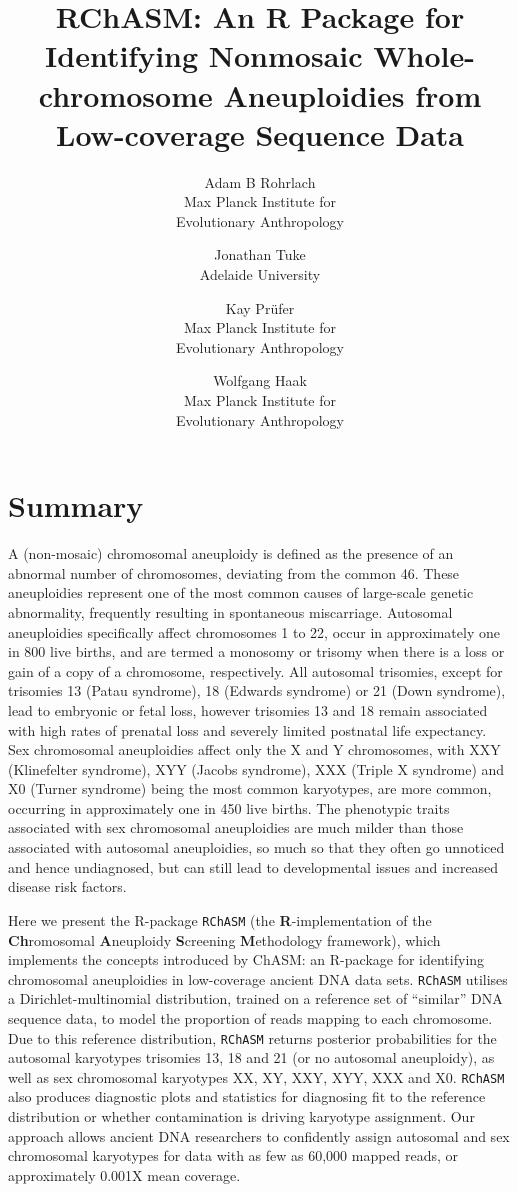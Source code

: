 \documentclass[10pt,a4paper]{article}
\title{\textbf{RChASM: An R Package for Identifying Nonmosaic Whole-chromosome Aneuploidies from Low-coverage Sequence Data}}
\author{
  Adam B Rohrlach\\Max Planck Institute for \\ Evolutionary Anthropology \and Jonathan Tuke\\Adelaide University \and Kay Prüfer\\Max Planck Institute for \\ Evolutionary Anthropology \and Wolfgang Haak\\Max Planck Institute for \\ Evolutionary Anthropology
}
\date{}
\begin{document}
\maketitle 

\section{Summary}

A (non-mosaic) chromosomal aneuploidy is defined as the presence of an abnormal number of chromosomes, deviating from the common 46\cite{orr2015aneuploidy}. These aneuploidies represent one of the most common causes of large-scale genetic abnormality, frequently resulting in spontaneous miscarriage\cite{hassold2001err}. Autosomal aneuploidies specifically affect chromosomes 1 to 22, occur in approximately one in 800 live births\cite{nagaoka2012human}, and are  termed a monosomy or trisomy when there is a loss or gain of a copy of a chromosome, respectively\cite{orr2015aneuploidy}. All autosomal trisomies, except for trisomies 13 (Patau syndrome), 18 (Edwards syndrome) or 21 (Down syndrome), lead to embryonic or fetal loss, however trisomies 13 and 18 remain associated with high rates of prenatal loss and severely limited postnatal life expectancy. Sex chromosomal aneuploidies affect only the X and Y chromosomes, with XXY (Klinefelter syndrome), XYY (Jacobs syndrome), XXX (Triple X syndrome) and X0 (Turner syndrome) being the most common karyotypes, are more common, occurring in approximately one in 450 live births\cite{samango2013snp}. The phenotypic traits associated with sex chromosomal aneuploidies are much milder than those associated with autosomal aneuploidies, so much so that they often go unnoticed and hence undiagnosed, but can still lead to developmental issues and increased disease risk factors\cite{skuse2018sex,hong2014cognitive}. 

Here we present the R-package \texttt{RChASM} (the \textbf{R}-implementation of the \textbf{Ch}romosomal \textbf{A}neuploidy \textbf{S}creening \textbf{M}ethodology framework), which implements the concepts introduced by ChASM\cite{rohrlach2026chasm}: an R-package for identifying chromosomal aneuploidies in low-coverage ancient DNA data sets. \texttt{RChASM} utilises a Dirichlet-multinomial distribution, trained on a reference set of ``similar'' DNA sequence data, to model the proportion of reads mapping to each chromosome. Due to this reference distribution, \texttt{RChASM} returns posterior probabilities for the autosomal karyotypes trisomies 13, 18 and 21 (or no autosomal aneuploidy), as well as sex chromosomal karyotypes  XX, XY, XXY, XYY, XXX and X0. \texttt{RChASM} also produces diagnostic plots and statistics for diagnosing fit to the reference distribution or whether contamination is driving karyotype assignment. Our approach allows ancient DNA researchers to confidently assign autosomal and sex chromosomal karyotypes for data with as few as 60,000 mapped reads, or approximately 0.001X mean coverage.
\end{document}

